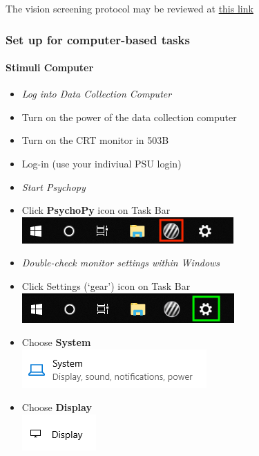 \documentclass[]{article}
\let\oldparagraph\paragraph
\renewcommand{\paragraph}[1]{\oldparagraph{#1}\mbox{}}
\begin{document}
The vision screening protocol may be reviewed at
\href{vision-screening-protocol.html}{this link}

\subsubsection{Set up for computer-based
tasks}\label{set-up-for-computer-based-tasks}

\paragraph{Stimuli Computer}\label{stimuli-computer}

\begin{itemize}
\item
  \emph{Log into Data Collection Computer}
\item
  Turn on the power of the data collection computer
\item
  Turn on the CRT monitor in 503B
\item
  Log-in (use your indiviual PSU login)
\item
  \emph{Start Psychopy}
\item
  Click \textbf{PsychoPy} icon on Task Bar
  \includegraphics{images/PsychoPy-1.PNG}\\
\item
  \emph{Double-check monitor settings within Windows}
\item
  Click Settings (`gear') icon on Task Bar
  \includegraphics{images/DispSettings-1.PNG}\\
\item
  Choose \textbf{System}\\
  \includegraphics{images/DS2.PNG}\\
\item
  Choose \textbf{Display}\\
  \includegraphics{images/ds3.PNG}\\

\end{itemize}
\end{document}

